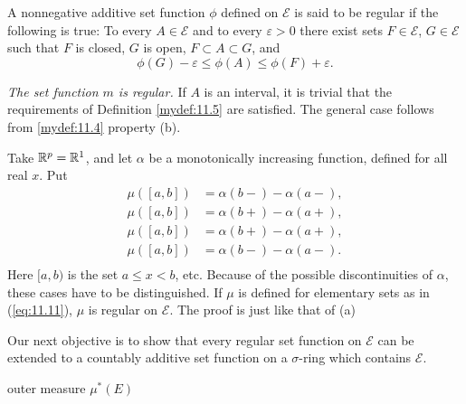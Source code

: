 \begin{mydef}
    \label{mydef:11.5}
    A nonnegative additive set function $\phi$ defined on $\mathscr{E}$ is said to be regular if the following is true: 
    To every $A \in \mathscr{E}$ and to every $\varepsilon > 0$ 
    there exist sets $F \in \mathscr{E}$, $G \in \mathscr{E}$ 
    such that $F$ is closed, $G$ is open, $F \subset A \subset G$, 
    and
    \begin{equation}
        \label{eq:11.16}
        \phi(G) - \varepsilon \leq 
        \phi(A) \leq 
        \phi(F) + \varepsilon . 
    \end{equation}
\end{mydef}

\begin{myExample}
    \begin{asparaenum}[(a)]
        \item \emph{The set function $m$ is regular.}
        If $A$ is an interval, it is trivial that the requirements of Definition \ref{mydef:11.5} are satisfied. The general case follows from \ref{mydef:11.4} property (b).
        \item Take ${\protect\mathbb R}^p = {\protect\mathbb R}^1$, and let $\alpha$ be a monotonically increasing function, defined for all real $x$. Put 
        \begin{align*}
            \mu([a,b]) &= \alpha(b-)-\alpha(a-),\\
            \mu([a,b]) &= \alpha(b+)-\alpha(a+),\\
            \mu([a,b]) &= \alpha(b+)-\alpha(a+),\\
            \mu([a,b]) &= \alpha(b-)-\alpha(a-).\\
        \end{align*}
        Here $[a,b)$ is the set $a \leq x < b$, etc.
        Because of the possible discontinuities of $\alpha$, these cases have to be distinguished.
        If $\mu$ is defined for elementary sets as in (\ref{eq:11.11}), $\mu$ is regular on $\mathscr{E}$.
        The proof is just like that of (a)
        \item 
    \end{asparaenum}
\end{myExample}

Our next objective is to show that every regular set function on $\mathscr{E}$ can be
extended to a countably additive set function on a $\sigma$-ring which contains $\mathscr{E}$.

\begin{mydef}
    \label{mydef:11.7}
    outer measure $\mu^*(E)$
\end{mydef}

